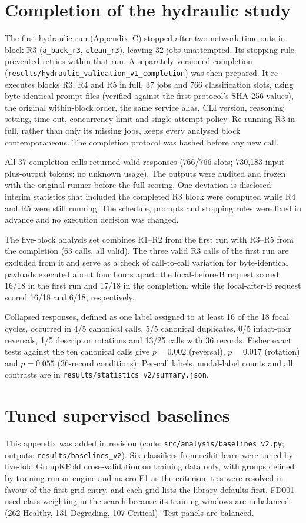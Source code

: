 \documentclass[11pt,a4paper]{article}
\begin{document}
\section{Completion of the hydraulic study}\label{app:hydraulic_completion}
The first hydraulic run (Appendix~C) stopped after two network time-outs in block R3 (\texttt{a\_back\_r3}, \texttt{clean\_r3}), leaving 32 jobs unattempted. Its stopping rule prevented retries within that run. A separately versioned completion (\nolinkurl{results/hydraulic_validation_v1_completion}) was then prepared. It re-executes blocks R3, R4 and R5 in full, 37 jobs and 766 classification slots, using byte-identical prompt files (verified against the first protocol's SHA-256 values), the original within-block order, the same service alias, CLI version, reasoning setting, time-out, concurrency limit and single-attempt policy. Re-running R3 in full, rather than only its missing jobs, keeps every analysed block contemporaneous. The completion protocol was hashed before any new call.

All 37 completion calls returned valid responses (766/766 slots; 730{,}183 input-plus-output tokens; no unknown usage). The outputs were audited and frozen with the original runner before the full scoring. One deviation is disclosed: interim statistics that included the completed R3 block were computed while R4 and R5 were still running. The schedule, prompts and stopping rules were fixed in advance and no execution decision was changed.

The five-block analysis set combines R1--R2 from the first run with R3--R5 from the completion (63 calls, all valid). The three valid R3 calls of the first run are excluded from it and serve as a check of call-to-call variation for byte-identical payloads executed about four hours apart: the focal-before-B request scored 16/18 in the first run and 17/18 in the completion, while the focal-after-B request scored 16/18 and 6/18, respectively.

Collapsed responses, defined as one label assigned to at least 16 of the 18 focal cycles, occurred in 4/5 canonical calls, 5/5 canonical duplicates, 0/5 intact-pair reversals, 1/5 descriptor rotations and 13/25 calls with 36 records. Fisher exact tests against the ten canonical calls give $p=0.002$ (reversal), $p=0.017$ (rotation) and $p=0.055$ (36-record conditions). Per-call labels, modal-label counts and all contrasts are in \texttt{results/statistics\_v2/summary.json}.

\section{Tuned supervised baselines}\label{app:baselines}
This appendix was added in revision (code: \texttt{src/analysis/baselines\_v2.py}; outputs: \texttt{results/baselines\_v2}). Six classifiers from scikit-learn were tuned by five-fold GroupKFold cross-validation on training data only, with groups defined by training run or engine and macro-F1 as the criterion; ties were resolved in favour of the first grid entry, and each grid lists the library defaults first. FD001 used class weighting in the search because its training windows are unbalanced (262 Healthy, 131 Degrading, 107 Critical). Test panels are balanced.
\end{document}
